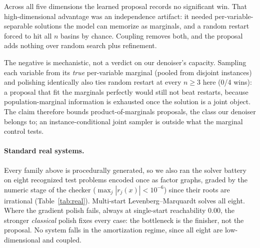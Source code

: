\documentclass[letterpaper]{article} %
\begin{document}
Across all five dimensions the learned proposal records no significant win. That high-dimensional advantage was an independence artifact: it needed
per-variable-separable solutions the model can memorize as marginals, and a random restart
forced to hit all $n$ basins by chance. Coupling removes both, and the proposal adds nothing
over random search plus refinement.

The negative is mechanistic, not a verdict on our denoiser's capacity. Sampling each variable
from its \emph{true} per-variable marginal (pooled from disjoint instances) and polishing identically also
ties random restart at every $n \ge 3$ here (0/4 wins): a proposal that fit the marginals
perfectly would still not beat restarts, because population-marginal information is exhausted
once the solution is a joint object. The claim therefore bounds
product-of-marginals proposals, the class our denoiser belongs to; an instance-conditional
joint sampler is outside what the marginal control tests.

\paragraph{Standard real systems.}
Every family above is procedurally generated, so we also ran the solver battery on eight
recognized test problems encoded once as factor graphs, graded by the numeric stage of the
checker ($\max_j |r_j(x)| < 10^{-6}$) since their roots are irrational
(Table~\ref{tab:real}).
Multi-start Levenberg--Marquardt solves all eight. Where the gradient polish fails, always at
single-start reachability $0.00$, the stronger \emph{classical} polish fixes every case: the
bottleneck is the finisher, not the proposal.
No system falls in the amortization regime, since all eight are low-dimensional and coupled.
\end{document}
